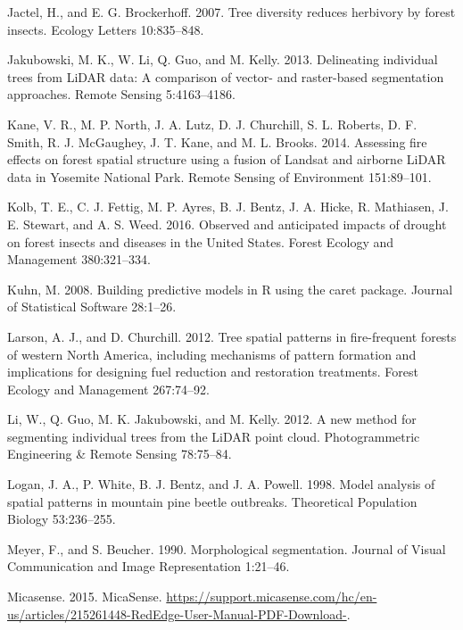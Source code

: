 \documentclass[]{article}
\begin{document}
\leavevmode\hypertarget{ref-jactel2007}{}%
Jactel, H., and E. G. Brockerhoff. 2007. Tree diversity reduces
herbivory by forest insects. Ecology Letters 10:835--848.

\leavevmode\hypertarget{ref-jakubowski2013}{}%
Jakubowski, M. K., W. Li, Q. Guo, and M. Kelly. 2013. Delineating
individual trees from LiDAR data: A comparison of vector- and
raster-based segmentation approaches. Remote Sensing 5:4163--4186.

\leavevmode\hypertarget{ref-kane2014}{}%
Kane, V. R., M. P. North, J. A. Lutz, D. J. Churchill, S. L. Roberts, D.
F. Smith, R. J. McGaughey, J. T. Kane, and M. L. Brooks. 2014. Assessing
fire effects on forest spatial structure using a fusion of Landsat and
airborne LiDAR data in Yosemite National Park. Remote Sensing of
Environment 151:89--101.

\leavevmode\hypertarget{ref-kolb2016}{}%
Kolb, T. E., C. J. Fettig, M. P. Ayres, B. J. Bentz, J. A. Hicke, R.
Mathiasen, J. E. Stewart, and A. S. Weed. 2016. Observed and anticipated
impacts of drought on forest insects and diseases in the United States.
Forest Ecology and Management 380:321--334.

\leavevmode\hypertarget{ref-kuhn2008}{}%
Kuhn, M. 2008. Building predictive models in R using the caret package.
Journal of Statistical Software 28:1--26.

\leavevmode\hypertarget{ref-larson2012}{}%
Larson, A. J., and D. Churchill. 2012. Tree spatial patterns in
fire-frequent forests of western North America, including mechanisms of
pattern formation and implications for designing fuel reduction and
restoration treatments. Forest Ecology and Management 267:74--92.

\leavevmode\hypertarget{ref-li2012}{}%
Li, W., Q. Guo, M. K. Jakubowski, and M. Kelly. 2012. A new method for
segmenting individual trees from the LiDAR point cloud. Photogrammetric
Engineering \& Remote Sensing 78:75--84.

\leavevmode\hypertarget{ref-logan1998}{}%
Logan, J. A., P. White, B. J. Bentz, and J. A. Powell. 1998. Model
analysis of spatial patterns in mountain pine beetle outbreaks.
Theoretical Population Biology 53:236--255.

\leavevmode\hypertarget{ref-meyer1990}{}%
Meyer, F., and S. Beucher. 1990. Morphological segmentation. Journal of
Visual Communication and Image Representation 1:21--46.

\leavevmode\hypertarget{ref-micasense2015}{}%
Micasense. 2015. MicaSense.
\url{https://support.micasense.com/hc/en-us/articles/215261448-RedEdge-User-Manual-PDF-Download-}.
\end{document}
